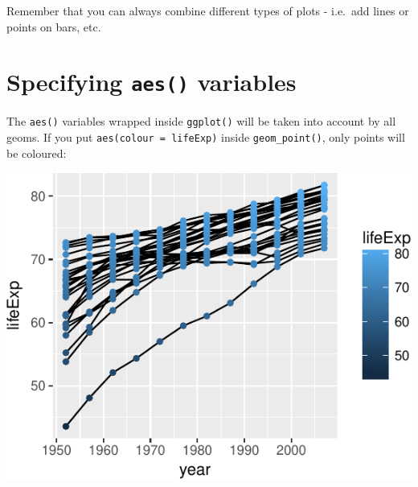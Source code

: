 \documentclass[12pt,]{krantz}
\makeatletter
\newenvironment{Shaded}{\begin{snugshade}}{\end{snugshade}}
\newcommand{\DataTypeTok}[1]{\textcolor[rgb]{0.13,0.29,0.53}{#1}}
\newcommand{\KeywordTok}[1]{\textcolor[rgb]{0.13,0.29,0.53}{\textbf{#1}}}
\newcommand{\NormalTok}[1]{#1}
\newcommand{\OperatorTok}[1]{\textcolor[rgb]{0.81,0.36,0.00}{\textbf{#1}}}
\newcommand{\StringTok}[1]{\textcolor[rgb]{0.31,0.60,0.02}{#1}}
\newenvironment{kframe}{%
\medskip{}
\setlength{\fboxsep}{.8em}
 \def\at@end@of@kframe{}%
 \ifinner\ifhmode%
  \def\at@end@of@kframe{\end{minipage}}%
  \begin{minipage}{\columnwidth}%
 \fi\fi%
 \def\FrameCommand##1{\hskip\@totalleftmargin \hskip-\fboxsep
 \colorbox{shadecolor}{##1}\hskip-\fboxsep
     \hskip-\linewidth \hskip-\@totalleftmargin \hskip\columnwidth}%
 \MakeFramed {\advance\hsize-\width
   \@totalleftmargin\z@ \linewidth\hsize
   \@setminipage}}%
 {\par\unskip\endMakeFramed%
 \at@end@of@kframe}
\renewenvironment{Shaded}{\begin{kframe}}{\end{kframe}}
\theoremstyle{definition}
\theoremstyle{definition}
\theoremstyle{definition}
\theoremstyle{remark}
\makeatother
\begin{document}
Remember that you can always combine different types of plots - i.e.~add
lines or points on bars, etc.

\hypertarget{specifying-aes-variables}{%
\section{\texorpdfstring{Specifying \texttt{aes()}
variables}{Specifying aes() variables}}\label{specifying-aes-variables}}

The \texttt{aes()} variables wrapped inside \texttt{ggplot()} will be
taken into account by all geoms. If you put
\texttt{aes(colour\ =\ lifeExp)} inside \texttt{geom\_point()}, only
points will be coloured:

\begin{Shaded}
\end{Shaded}

\includegraphics{04_plotting_files/figure-latex/unnamed-chunk-16-1.pdf}
\end{document}

